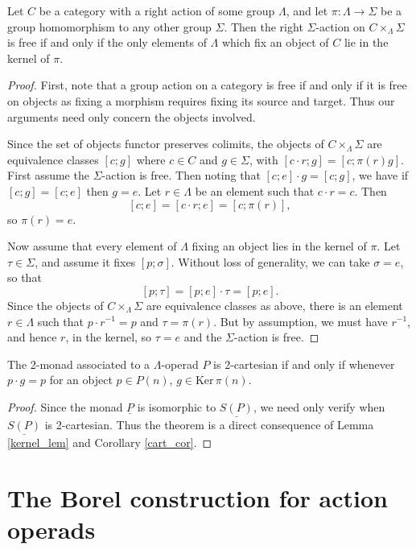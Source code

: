 \documentclass{amsbook} %
\numberwithin{section}{chapter}
\begin{document}
\begin{lem}\label{kernel_lem}
Let $C$ be a category with a right action of some group $\Lambda$, and let $\pi: \Lambda \to \Sigma$ be a group homomorphism to any other group $\Sigma$.  Then the right $\Sigma$-action on $C \times_{\Lambda} \Sigma$ is free if and only if the only elements of $\Lambda$ which fix an object of $C$ lie in the kernel of $\pi$.
\end{lem}
\begin{proof}
First, note that a group action on a category is free if and only if it is free on objects as fixing a morphism requires fixing its source and target.  Thus our arguments need only concern the objects involved.

Since the set of objects functor preserves colimits, the objects of $C \times_{\Lambda} \Sigma$ are equivalence classes $[c;g]$ where $c \in C$ and $g \in \Sigma$, with $[c\cdot r;g] = [c; \pi(r)g]$.  First assume the $\Sigma$-action is free.  Then noting that $[c;e]\cdot g =[c;g]$, we have if $[c;g] = [c;e]$ then $g=e$.  Let $r \in \Lambda$ be an element such that $c\cdot r = c$.  Then
\[
[c;e] = [c\cdot r; e] = [c; \pi(r)],
\]
so $\pi(r) = e$.

Now assume that every element of $\Lambda$ fixing an object lies in the kernel of $\pi$.  Let $\tau \in \Sigma$, and assume it fixes $[p; \sigma]$.  Without loss of generality, we can take $\sigma = e$, so that
\[
[p; \tau] = [p;e]\cdot \tau = [p;e].
\]
Since the objects of $C \times_{\Lambda} \Sigma$ are equivalence classes as above, there is an element $r \in \Lambda$ such that $p\cdot r^{-1} = p$ and $\tau = \pi(r)$.  But by assumption, we must have $r^{-1}$, and hence $r$, in the kernel, so $\tau = e$ and the $\Sigma$-action is free.
\end{proof}

\begin{thm}\label{cart_thm}
The 2-monad associated to a $\Lambda$-operad $P$ is 2-cartesian if and only if whenever $p \cdot g = p$ for an object $p \in P(n)$, $g \in \textrm{Ker} \, \pi (n)$.
\end{thm}
\begin{proof}
Since the monad $\underline{P}$ is isomorphic to $\underline{S(P)}$, we need only verify when $\underline{S(P)}$ is 2-cartesian.  Thus the theorem is a direct consequence of Lemma \ref{kernel_lem} and Corollary \ref{cart_cor}.
\end{proof}

\section{The Borel construction for action operads}
\end{document}
